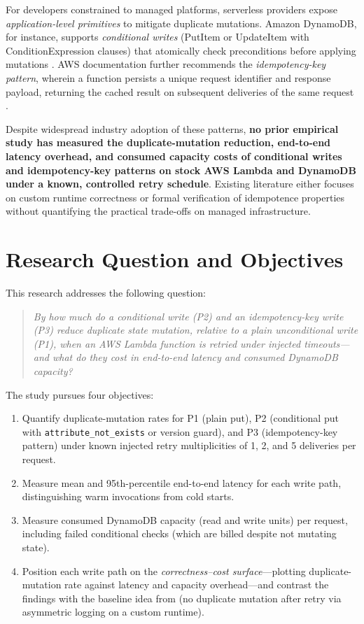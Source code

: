 For developers constrained to managed platforms, serverless providers expose \textit{application-level primitives} to mitigate duplicate mutations. Amazon DynamoDB, for instance, supports \textit{conditional writes} (PutItem or UpdateItem with ConditionExpression clauses) that atomically check preconditions before applying mutations \citep{Elhemali2022DynamoDB, AWSDynamoDBDocs}. AWS documentation further recommends the \textit{idempotency-key pattern}, wherein a function persists a unique request identifier and response payload, returning the cached result on subsequent deliveries of the same request \citep{AWSPowertoolsDocs}.

Despite widespread industry adoption of these patterns, \textbf{no prior empirical study has measured the duplicate-mutation reduction, end-to-end latency overhead, and consumed capacity costs of conditional writes and idempotency-key patterns on stock AWS Lambda and DynamoDB under a known, controlled retry schedule}. Existing literature either focuses on custom runtime correctness \citep{Qi2025Halfmoon, Jia2024Boki, Zhang2024CausalMesh} or formal verification of idempotence properties \citep{Ding2023Flux} without quantifying the practical trade-offs on managed infrastructure.

\section{Research Question and Objectives}

This research addresses the following question:

\begin{quote}
\textit{By how much do a conditional write (P2) and an idempotency-key write (P3) reduce duplicate state mutation, relative to a plain unconditional write (P1), when an AWS Lambda function is retried under injected timeouts---and what do they cost in end-to-end latency and consumed DynamoDB capacity?}
\end{quote}

\noindent The study pursues four objectives:

\begin{enumerate}
    \item Quantify duplicate-mutation rates for P1 (plain put), P2 (conditional put with \texttt{attribute\_not\_exists} or version guard), and P3 (idempotency-key pattern) under known injected retry multiplicities of 1, 2, and 5 deliveries per request.
    \item Measure mean and 95th-percentile end-to-end latency for each write path, distinguishing warm invocations from cold starts.
    \item Measure consumed DynamoDB capacity (read and write units) per request, including failed conditional checks (which are billed despite not mutating state).
    \item Position each write path on the \textit{correctness--cost surface}---plotting duplicate-mutation rate against latency and capacity overhead---and contrast the findings with the baseline idea from \citet{Qi2025Halfmoon} (no duplicate mutation after retry via asymmetric logging on a custom runtime).
\end{enumerate}

